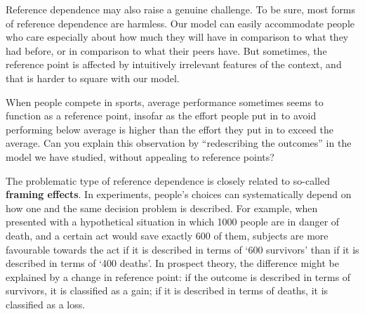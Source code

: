 
Reference dependence may also raise a genuine challenge. To be sure,
most forms of reference dependence are harmless. Our model can easily
accommodate people who care especially about how much they will have in
comparison to what they had before, or in comparison to what their
peers have. But sometimes, the reference point is affected by
intuitively irrelevant features of the context, and that is harder to
square with our model.

\begin{exercise1}
  When people compete in sports, average performance sometimes seems
  to function as a reference point, insofar as the effort people put in
  to avoid performing below average is higher than the effort they put
  in to exceed the average.%
  Can you explain this observation by ``redescribing the outcomes'' in
  the model we have studied, without appealing to reference points?
\end{exercise1}


The problematic type of reference dependence is closely related to
so-called \textbf{framing effects}. In experiments, people's choices
can systematically depend on how one and the same decision problem is
described. For example, when presented with a hypothetical situation
in which 1000 people are in danger of death, and a certain act would
save exactly 600 of them, subjects are more favourable towards the act
if it is described in terms of `600 survivors' than if it is described
in terms of `400 deaths'. In prospect theory, the difference might be
explained by a change in reference point: if the outcome is described
in terms of survivors, it is classified as a gain; if it is described
in terms of deaths, it is classified as a loss.

